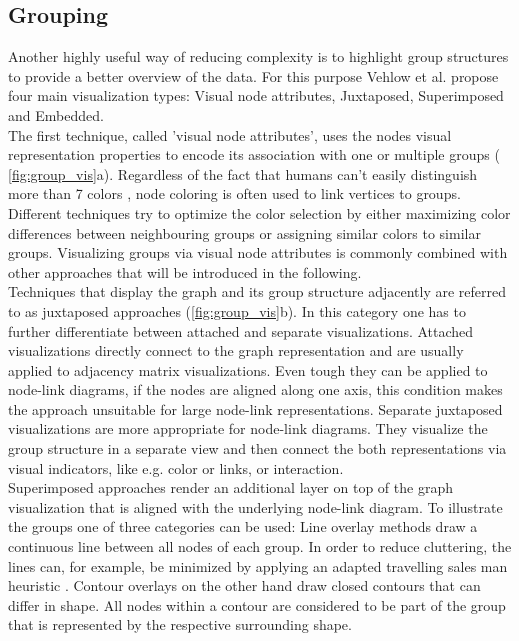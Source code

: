 \subsection{Grouping}
Another highly useful way of reducing complexity is to highlight group structures to provide a better overview of the data. For this purpose Vehlow et al.\cite{Vehlow2015} propose four main visualization types: Visual node attributes, Juxtaposed, Superimposed and Embedded.\\
The first technique, called 'visual node attributes', uses the nodes visual representation properties to encode its association with one or multiple groups ( \autoref{fig:group_vis}a). Regardless of the fact that humans can't easily distinguish more than 7 colors \cite{Healey1996}, node coloring is often used to link vertices to groups. Different techniques try to optimize the color selection by either maximizing color differences between neighbouring groups or assigning similar colors to similar groups. Visualizing groups via visual node attributes is commonly combined with other approaches that will be introduced in the following.\\
Techniques that display the graph and its group structure adjacently are referred to as juxtaposed approaches (\autoref{fig:group_vis}b). In this category one has to further differentiate between attached and separate visualizations. Attached visualizations directly connect to the graph representation and are usually applied to adjacency matrix visualizations. Even tough they can be applied to node-link diagrams, if the nodes are aligned along one axis, this condition makes the approach unsuitable for large node-link representations.
Separate juxtaposed visualizations are more appropriate for node-link diagrams. They visualize the group structure in a separate view and then connect the both representations via visual indicators, like e.g. color or links, or interaction.\\
Superimposed approaches render an additional layer on top of the graph visualization that is aligned with the underlying node-link diagram. To illustrate the groups one of three categories can be used: Line overlay methods draw a continuous line between all nodes of each group. In order to reduce cluttering, the lines can, for example, be minimized by applying an adapted travelling sales man heuristic \cite{Alper2011}. Contour overlays on the other hand draw closed contours that can differ in shape. All nodes within a contour are considered to be part of the group that is represented by the respective surrounding shape.
